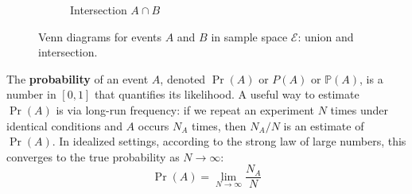 \begin{figure}[h]
\begin{subfigure}[t]{0.47\textwidth}
    \caption{Intersection $A\cap B$}
    \label{fig:venn-intersection}
    \end{subfigure}
    
    \caption{Venn diagrams for events \(A\) and \(B\) in sample space $\mathcal{E}$: union and intersection.}
    \label{fig:venn-probability}
\end{figure}


The \textbf{probability} of an event $A$, denoted $\Pr(A)$ or $P(A)$ or $\mathbb{P}(A)$, is a number in $[0,1]$ that quantifies its likelihood. A useful way to estimate $\Pr(A)$ is via long-run frequency: if we repeat an experiment $N$ times under identical conditions and $A$ occurs $N_A$ times, then $N_A/N$ is an estimate of $\Pr(A)$. In idealized settings, according to the strong law of large numbers, this converges to the true probability as $N \to \infty$:
\begin{equation}
    \Pr(A) = \lim_{N\to\infty} \frac{N_A}{N}
    \label{eq:prob-limit}
\end{equation}

